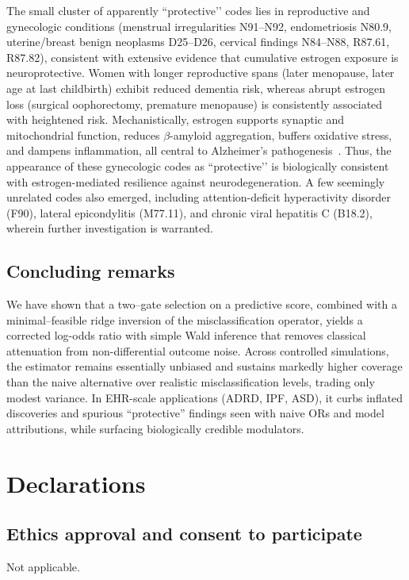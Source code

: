 \documentclass[pdflatex,sn-mathphys-num]{sn-jnl}%
\theoremstyle{thmstyleone}%
\theoremstyle{thmstyletwo}%
\theoremstyle{thmstylethree}%
\begin{document}
The small cluster of apparently ``protective’’ codes lies in reproductive and gynecologic conditions (menstrual irregularities N91–N92, endometriosis N80.9, uterine/breast benign neoplasms D25–D26, cervical findings N84–N88, R87.61, R87.82), consistent with extensive evidence that cumulative estrogen exposure is neuroprotective. Women with longer reproductive spans (later menopause, later age at last childbirth) exhibit reduced dementia risk, whereas abrupt estrogen loss (surgical oophorectomy, premature menopause) is consistently associated with heightened risk. Mechanistically, estrogen supports synaptic and mitochondrial function, reduces $\beta$-amyloid aggregation, buffers oxidative stress, and dampens inflammation, all central to Alzheimer’s pathogenesis~\cite{zarate2017role,Georgakis2016}. Thus, the appearance of these gynecologic codes as “protective’’ is biologically consistent with estrogen-mediated resilience against neurodegeneration.  
A few seemingly unrelated codes also emerged, including attention-deficit hyperactivity disorder (F90), lateral epicondylitis (M77.11), and chronic viral hepatitis C (B18.2),
wherein further investigation is warranted.
 
\subsection*{Concluding remarks}
We have shown that a two–gate selection on a predictive score, combined with a minimal–feasible ridge inversion of the misclassification operator, yields a corrected log-odds ratio with simple Wald inference that removes classical attenuation from non-differential outcome noise. Across controlled simulations, the estimator remains essentially unbiased and sustains markedly higher coverage than the naive alternative over realistic misclassification levels, trading only modest variance. In EHR-scale applications (ADRD, IPF, ASD), it curbs inflated discoveries and spurious “protective” findings seen with naive ORs and model attributions, while surfacing biologically credible modulators. 


\section{Declarations}

\subsection*{Ethics approval and consent to participate}
Not applicable.
\end{document}
